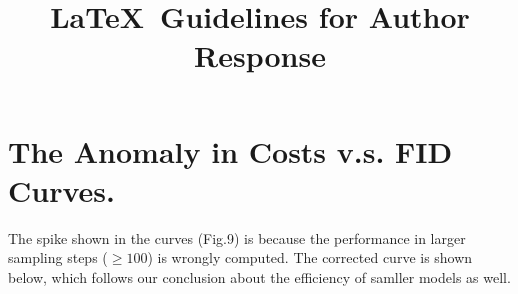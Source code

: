 \documentclass[10pt,twocolumn,letterpaper]{article}
\begin{document}
\title{\LaTeX\ Guidelines for Author Response}  %

\thispagestyle{empty}
\appendix


\section{The Anomaly in Costs v.s. FID Curves.}
The spike shown in the curves (Fig.9) is because the performance in larger sampling steps ($\geq 100$) is wrongly computed.
The corrected curve is shown below, which follows our conclusion about the efficiency of samller models as well.


{
    \small
    
    
}
\end{document}
